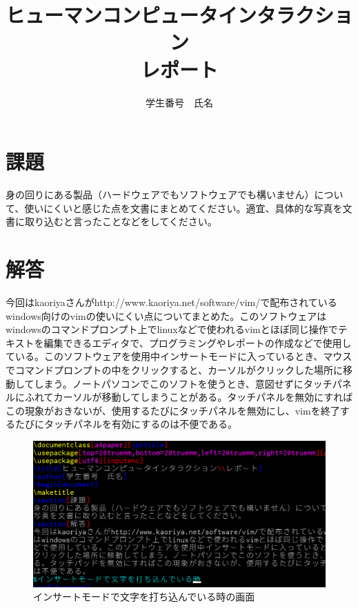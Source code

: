 \documentclass[a4paper]{jarticle}
\title{ヒューマンコンピュータインタラクション\\レポート}
\author{学生番号　氏名}
\begin{document}
\maketitle
\section{課題}
身の回りにある製品（ハードウェアでもソフトウェアでも構いません）について、使いにくいと感じた点を文書にまとめてください。適宜、具体的な写真を文書に取り込むと言ったことなどをしてください。
\section{解答}
今回はkaoriyaさんがhttp://www.kaoriya.net/software/vim/で配布されているwindows向けのvimの使いにくい点についてまとめた。このソフトウェアはwindowsのコマンドプロンプト上でlinuxなどで使われるvimとほぼ同じ操作でテキストを編集できるエディタで、プログラミングやレポートの作成などで使用している。このソフトウェアを使用中インサートモードに入っているとき、マウスでコマンドプロンプトの中をクリックすると、カーソルがクリックした場所に移動してしまう。ノートパソコンでこのソフトを使うとき、意図せずにタッチパネルにふれてカーソルが移動してしまうことがある。タッチパネルを無効にすればこの現象がおきないが、使用するたびにタッチパネルを無効にし、vimを終了するたびにタッチパネルを有効にするのは不便である。
\begin{figure}[H]
	\begin{center}
		\includegraphics[width=15cm]{screenshot1edited.png}
		\caption{インサートモードで文字を打ち込んでいる時の画面}
		\label{screenshot1edited}
	\end{center}
\end{figure}
\end{document}
